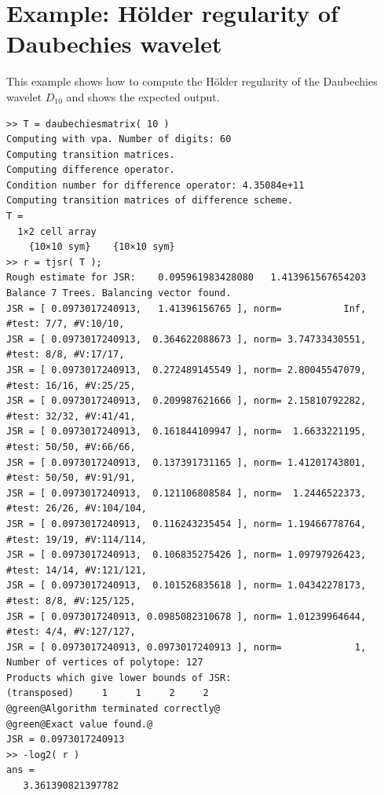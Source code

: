 \section{Example: Hölder regularity of Daubechies wavelet}
This example shows how to compute the Hölder regularity of the Daubechies wavelet $D_10$
and shows the expected output.
\begin{lstlisting}
>> T = daubechiesmatrix( 10 )
Computing with vpa. Number of digits: 60
Computing transition matrices.
Computing difference operator.
Condition number for difference operator: 4.35084e+11
Computing transition matrices of difference scheme.
T =
  1×2 cell array
    {10×10 sym}    {10×10 sym}
>> r = tjsr( T );
Rough estimate for JSR:    0.095961983428080   1.413961567654203
Balance 7 Trees. Balancing vector found.
JSR = [ 0.0973017240913,   1.41396156765 ], norm=           Inf, #test: 7/7, #V:10/10, 
JSR = [ 0.0973017240913,  0.364622088673 ], norm= 3.74733430551, #test: 8/8, #V:17/17, 
JSR = [ 0.0973017240913,  0.272489145549 ], norm= 2.80045547079, #test: 16/16, #V:25/25, 
JSR = [ 0.0973017240913,  0.209987621666 ], norm= 2.15810792282, #test: 32/32, #V:41/41, 
JSR = [ 0.0973017240913,  0.161844109947 ], norm=  1.6633221195, #test: 50/50, #V:66/66, 
JSR = [ 0.0973017240913,  0.137391731165 ], norm= 1.41201743801, #test: 50/50, #V:91/91, 
JSR = [ 0.0973017240913,  0.121106808584 ], norm=  1.2446522373, #test: 26/26, #V:104/104, 
JSR = [ 0.0973017240913,  0.116243235454 ], norm= 1.19466778764, #test: 19/19, #V:114/114, 
JSR = [ 0.0973017240913,  0.106835275426 ], norm= 1.09797926423, #test: 14/14, #V:121/121, 
JSR = [ 0.0973017240913,  0.101526835618 ], norm= 1.04342278173, #test: 8/8, #V:125/125, 
JSR = [ 0.0973017240913, 0.0985082310678 ], norm= 1.01239964644, #test: 4/4, #V:127/127, 
JSR = [ 0.0973017240913, 0.0973017240913 ], norm=             1, 
Number of vertices of polytope: 127
Products which give lower bounds of JSR: 
(transposed)     1     1     2     2
@green@Algorithm terminated correctly@
@green@Exact value found.@
JSR = 0.0973017240913
>> -log2( r )
ans =
   3.361390821397782
\end{lstlisting}

